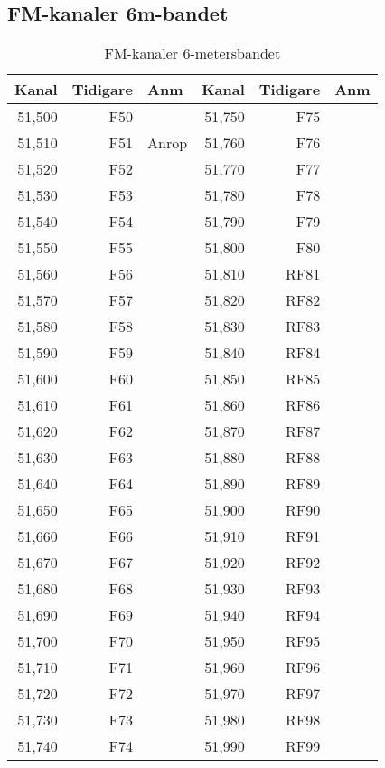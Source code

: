 {\subsection{FM-kanaler 6m-bandet}

\begin{longtable}{rrl|rrl}
\caption{FM-kanaler 6-metersbandet}\\
\textbf{Kanal} & \textbf{Tidigare} & \textbf{Anm}
&  \textbf{Kanal} & \textbf{Tidigare} & \textbf{Anm} \\ \hline
	51,500 &      F50 &       & 51,750 &      F75 &  \\
	51,510 &      F51 & Anrop & 51,760 &      F76 &  \\
	51,520 &      F52 &       & 51,770 &      F77 &  \\
	51,530 &      F53 &       & 51,780 &      F78 &  \\
	51,540 &      F54 &       & 51,790 &      F79 &  \\
	51,550 &      F55 &       & 51,800 &      F80 &  \\
	51,560 &      F56 &       & 51,810 &     RF81 &  \\
	51,570 &      F57 &       & 51,820 &     RF82 &  \\
	51,580 &      F58 &       & 51,830 &     RF83 &  \\
	51,590 &      F59 &       & 51,840 &     RF84 &  \\
	51,600 &      F60 &       & 51,850 &     RF85 &  \\
	51,610 &      F61 &       & 51,860 &     RF86 &  \\
	51,620 &      F62 &       & 51,870 &     RF87 &  \\
	51,630 &      F63 &       & 51,880 &     RF88 &  \\
	51,640 &      F64 &       & 51,890 &     RF89 &  \\
	51,650 &      F65 &       & 51,900 &     RF90 &  \\
	51,660 &      F66 &       & 51,910 &     RF91 &  \\
	51,670 &      F67 &       & 51,920 &     RF92 &  \\
	51,680 &      F68 &       & 51,930 &     RF93 &  \\
	51,690 &      F69 &       & 51,940 &     RF94 &  \\
	51,700 &      F70 &       & 51,950 &     RF95 &  \\
	51,710 &      F71 &       & 51,960 &     RF96 &  \\
	51,720 &      F72 &       & 51,970 &     RF97 &  \\
	51,730 &      F73 &       & 51,980 &     RF98 &  \\
	51,740 &      F74 &       & 51,990 &     RF99 &
\end{longtable}

}
